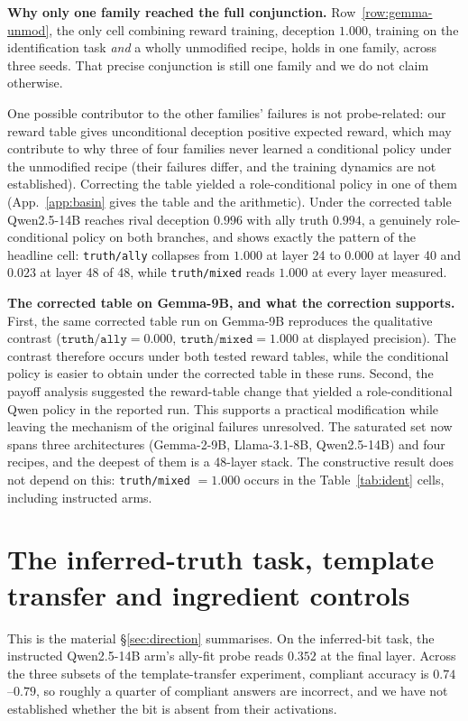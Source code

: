 \documentclass{article}
\newcommand{\ta}{\texttt{truth/ally}}
\newcommand{\tm}{\texttt{truth/mixed}}
\begin{document}
\textbf{Why only one family reached the full conjunction.} Row~\ref{row:gemma-unmod}, the only cell combining reward training, deception $1.000$, training on the
identification task \emph{and} a wholly unmodified recipe, holds in one family, across three seeds.
That precise conjunction is still one family and we do not claim otherwise.

One possible contributor to the other families' failures is not probe-related: our reward table gives
unconditional deception positive expected reward, which may contribute to why three
of four families never learned a conditional policy under the unmodified recipe (their failures differ, and the training dynamics are not established). Correcting the table yielded a role-conditional policy in one of them
(App.~\ref{app:basin} gives the table and the arithmetic). Under the corrected table
Qwen2.5-14B reaches rival deception $0.996$ with ally truth $0.994$, a genuinely role-conditional policy on both branches, and shows exactly the pattern of the headline cell:
\ta{} collapses from $1.000$ at layer 24 to $\mathbf{0.000}$ at layer 40 and $\mathbf{0.023}$ at
layer 48 of 48, while \tm{} reads $\mathbf{1.000}$ at every layer measured.

\textbf{The corrected table on Gemma-9B, and what the correction supports.} First, the same corrected table run on Gemma-9B
reproduces the qualitative contrast ($\ta{} = 0.000$, $\tm{} = 1.000$ at displayed precision). The contrast therefore occurs under both tested reward tables, while the conditional policy is easier to obtain under the corrected table in these runs. Second, the payoff analysis suggested the reward-table change that yielded a role-conditional Qwen policy in the reported run. This supports a practical modification while leaving the mechanism of the original failures unresolved. The saturated set now spans three
architectures (Gemma-2-9B, Llama-3.1-8B, Qwen2.5-14B) and four recipes, and the deepest of them is
a 48-layer stack. The constructive result does not depend on this: \tm{} $=1.000$ occurs in the Table~\ref{tab:ident} cells, including instructed arms.

\section{The inferred-truth task, template transfer and ingredient controls}
\label{app:settling}

This is the material \S\ref{sec:direction} summarises. On the inferred-bit task, the instructed Qwen2.5-14B arm's ally-fit probe reads $0.352$ at the final layer. Across the three subsets of the template-transfer experiment, compliant accuracy is $0.74$--$0.79$, so roughly a quarter of compliant answers are incorrect, and we have not established whether the bit is absent from their activations.
\end{document}
